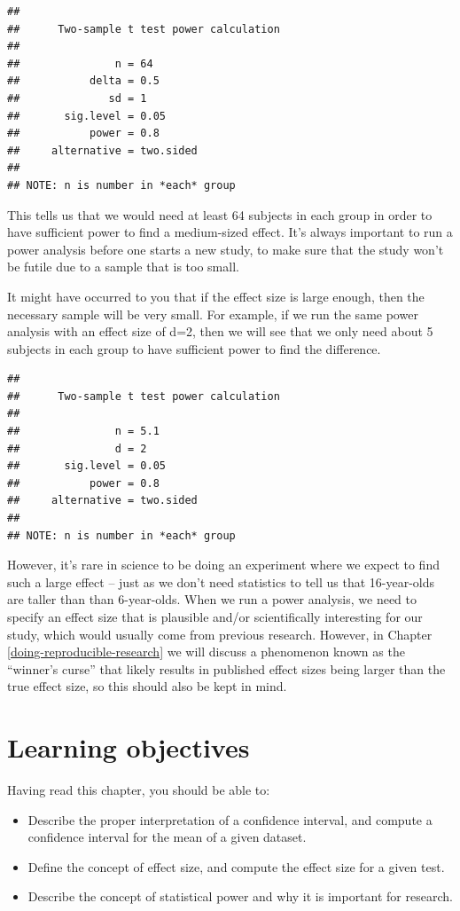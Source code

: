 \documentclass[12pt,]{book}
\providecommand{\tightlist}{%
  \setlength{\itemsep}{0pt}\setlength{\parskip}{0pt}}
\theoremstyle{definition}
\theoremstyle{definition}
\theoremstyle{definition}
\theoremstyle{remark}
\begin{document}
\begin{verbatim}
## 
##      Two-sample t test power calculation 
## 
##               n = 64
##           delta = 0.5
##              sd = 1
##       sig.level = 0.05
##           power = 0.8
##     alternative = two.sided
## 
## NOTE: n is number in *each* group
\end{verbatim}

This tells us that we would need at least 64 subjects in each group in order to have sufficient power to find a medium-sized effect. It's always important to run a power analysis before one starts a new study, to make sure that the study won't be futile due to a sample that is too small.

It might have occurred to you that if the effect size is large enough, then the necessary sample will be very small. For example, if we run the same power analysis with an effect size of d=2, then we will see that we only need about 5 subjects in each group to have sufficient power to find the difference.

\begin{verbatim}
## 
##      Two-sample t test power calculation 
## 
##               n = 5.1
##               d = 2
##       sig.level = 0.05
##           power = 0.8
##     alternative = two.sided
## 
## NOTE: n is number in *each* group
\end{verbatim}

However, it's rare in science to be doing an experiment where we expect to find such a large effect -- just as we don't need statistics to tell us that 16-year-olds are taller than than 6-year-olds. When we run a power analysis, we need to specify an effect size that is plausible and/or scientifically interesting for our study, which would usually come from previous research. However, in Chapter \ref{doing-reproducible-research} we will discuss a phenomenon known as the ``winner's curse'' that likely results in published effect sizes being larger than the true effect size, so this should also be kept in mind.

\hypertarget{learning-objectives-9}{%
\section{Learning objectives}\label{learning-objectives-9}}

Having read this chapter, you should be able to:

\begin{itemize}
\tightlist
\item
  Describe the proper interpretation of a confidence interval, and compute a confidence interval for the mean of a given dataset.
\item
  Define the concept of effect size, and compute the effect size for a given test.
\item
  Describe the concept of statistical power and why it is important for research.
\end{itemize}
\end{document}

